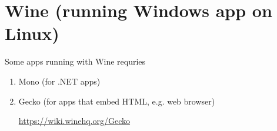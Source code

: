\chapter{Wine (running Windows app on Linux)}


Some apps running with Wine requries
\begin{enumerate}
  \item Mono (for .NET apps)
  
  \item Gecko (for apps that embed HTML, e.g. web browser)

\url{https://wiki.winehq.org/Gecko}

\end{enumerate}
